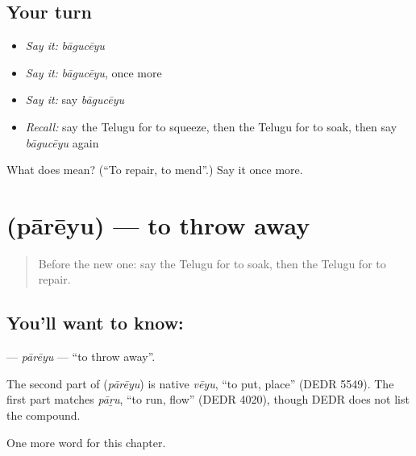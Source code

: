 \subsection*{Your turn}
\begin{itemize}
\raggedright
  \item \emph{Say it:} \emph{bāgucēyu}
  \item \emph{Say it:} \emph{bāgucēyu}, once more
  \item \emph{Say it:} say \emph{bāgucēyu}
  \item \emph{Recall:} say the Telugu for to squeeze, then the Telugu for to soak, then say \emph{bāgucēyu} again
\end{itemize}

\begin{tcolorbox}[breakable,colback=teal!4,colframe=teal!35!black,title={Before you move on}]
What does  mean? (\textquotedblleft{}To repair, to mend\textquotedblright{}.) Say it once more.
\end{tcolorbox}
\section[\texorpdfstring{\te{పారేయు} (pārēyu)}{పారేయు (pārēyu)}]{ (pārēyu) — to throw away}

\label{lesson:TE-C159-pareyu}



\begin{quote}
Before the new one: say the Telugu for to soak, then the Telugu for to repair.
\end{quote}

\subsection*{You'll want to know: }
\textbf{} — \emph{pārēyu} — \textquotedblleft{}to throw away\textquotedblright{}.

\begin{cousinweb}
The second part of \textbf{} (\emph{pārēyu}) is native \emph{vēyu}, \textquotedblleft{}to put, place\textquotedblright{} (DEDR 5549). The first part matches \emph{pāṟu}, \textquotedblleft{}to run, flow\textquotedblright{} (DEDR 4020), though DEDR does not list the compound.
\end{cousinweb}

\begin{grammarlens}[title={What you've built}]
One more word for this chapter.
\end{grammarlens}

